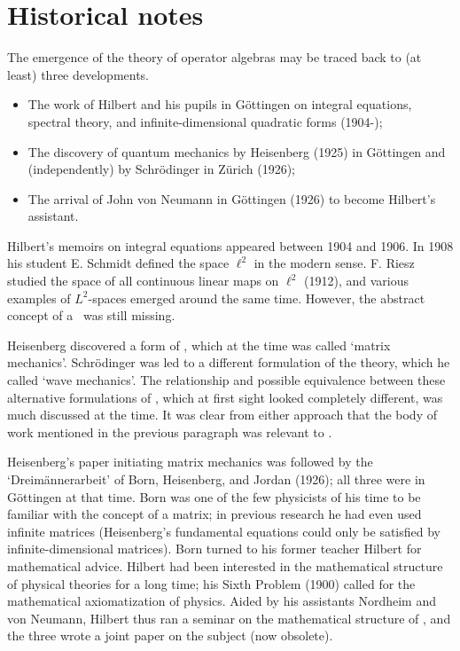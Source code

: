 \section{Historical notes}
 The
emergence of the theory of operator algebras may be traced back to (at
least) three developments.
\begin{itemize}
\item
The work of Hilbert and his pupils in G\"{o}ttingen on integral
equations, spectral theory, and infinite-dimensional quadratic forms
(1904-);
\item
The discovery of quantum mechanics by Heisenberg (1925) in
G\"{o}ttingen and (independently) by Schr\"{o}dinger in Z\"{u}rich
(1926);
\item
The arrival of John von Neumann in G\"{o}ttingen (1926) to become
Hilbert's assistant.
\end{itemize}
Hilbert's memoirs on integral equations appeared between 1904 and
1906.  In 1908 his student E. Schmidt defined the space $\ell^2$ in
the modern sense.  F. Riesz studied the space of all continuous linear
maps on $\ell^2$ (1912), and various examples of $L^2$-spaces emerged
around the same time.  However, the abstract concept of a \Hs\ was
still missing.

Heisenberg discovered a form of \qm, which at the time was called
`matrix mechanics'. Schr\"{o}dinger was led to a different formulation
of the theory, which he called `wave mechanics'. The relationship and
possible equivalence between these alternative formulations of \qm,
which at first sight looked completely different, was much discussed
at the time.  It was clear from either approach that the body of work
mentioned in the previous paragraph was relevant to \qm.

Heisenberg's paper initiating matrix mechanics was followed by the
`Drei\-m\"{a}n\-nerarbeit' of Born, Heisenberg, and Jordan (1926); all
three were in G\"{o}ttingen at that time. Born was one of the few
physicists of his time to be familiar with the concept of a matrix; in
previous research he had even used infinite matrices (Heisenberg's
fundamental equations could only be satisfied by infinite-dimensional
matrices).  Born turned to his former teacher Hilbert for mathematical
advice.  Hilbert had been interested in the mathematical structure of
physical theories for a long time; his Sixth Problem (1900) called for
the mathematical axiomatization of physics.  Aided by his assistants
Nordheim and von Neumann, Hilbert thus ran a seminar on the
mathematical structure of \qm, and the three wrote a joint paper on
the subject (now obsolete).

